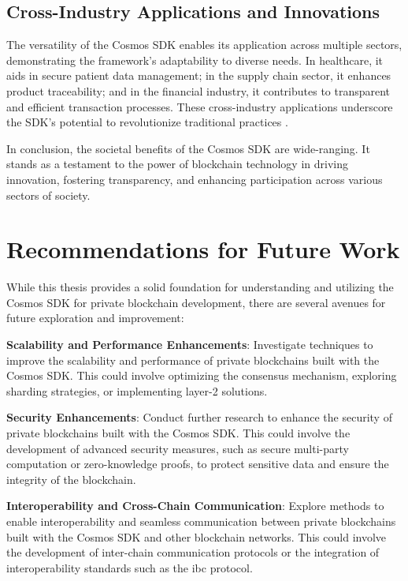 \subsection{Cross-Industry Applications and Innovations}

The versatility of the Cosmos SDK enables its application across multiple sectors, demonstrating the framework's adaptability to diverse needs. In healthcare, it aids in secure patient data management; in the supply chain sector, it enhances product traceability; and in the financial industry, it contributes to transparent and efficient transaction processes. These cross-industry applications underscore the SDK's potential to revolutionize traditional practices \cite{Princeton2023}.

In conclusion, the societal benefits of the Cosmos SDK are wide-ranging. It stands as a testament to the power of blockchain technology in driving innovation, fostering transparency, and enhancing participation across various sectors of society.


\section{Recommendations for Future Work}

While this thesis provides a solid foundation for understanding and utilizing the Cosmos SDK for private blockchain development, there are several avenues for future exploration and improvement:

    \textbf{Scalability and Performance Enhancements}: Investigate techniques to improve the scalability and performance of private blockchains built with the Cosmos SDK. This could involve optimizing the consensus mechanism, exploring sharding strategies, or implementing layer-2 solutions.

    \textbf{Security Enhancements}: Conduct further research to enhance the security of private blockchains built with the Cosmos SDK. This could involve the development of advanced security measures, such as secure multi-party computation or zero-knowledge proofs, to protect sensitive data and ensure the integrity of the blockchain.

    \textbf{Interoperability and Cross-Chain Communication}: Explore methods to enable interoperability and seamless communication between private blockchains built with the Cosmos SDK and other blockchain networks. This could involve the development of inter-chain communication protocols or the integration of interoperability standards such as the \gls{ibc} protocol.

